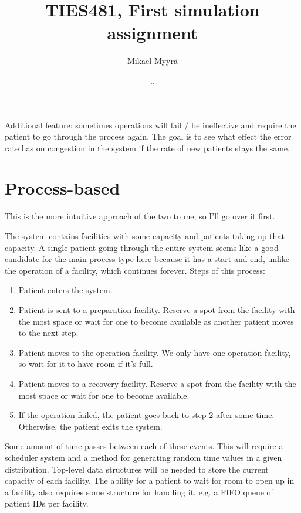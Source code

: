 \documentclass{article}
\title{TIES481, First simulation assignment}
\author{Mikael Myyrä}
\date{\number\day.\number\month.\number\year}
\begin{document}
\maketitle

Additional feature: sometimes operations will fail / be ineffective and require the
patient to go through the process again. The goal is to see what effect the
error rate has on congestion in the system if the rate of new patients stays
the same.

\section*{Process-based}

This is the more intuitive approach of the two to me, so I'll go over it first.

The system contains facilities with some capacity and patients taking up that capacity.
A single patient going through the entire system seems like a good candidate
for the main process type here because it has a start and end, unlike the
operation of a facility, which continues forever. Steps of this process:
\begin{enumerate}
  \item{Patient enters the system.}
  \item{Patient is sent to a preparation facility. Reserve a spot from the
    facility with the most space or wait for one to become available as another
    patient moves to the next step.}
  \item{Patient moves to the operation facility. We only have one operation
    facility, so wait for it to have room if it's full.}
  \item{Patient moves to a recovery facility. Reserve a spot from the facility
    with the most space or wait for one to become available.}
  \item{If the operation failed, the patient goes back to step 2 after some
    time. Otherwise, the patient exits the system.}
\end{enumerate}

Some amount of time passes between each of these events. This will require a
scheduler system and a method for generating random time values in a given
distribution. Top-level data structures will be needed to store the
current capacity of each facility. The ability for a patient to wait for room
to open up in a facility also requires some structure for handling it, e.g. a
FIFO queue of patient IDs per facility.
\end{document}
